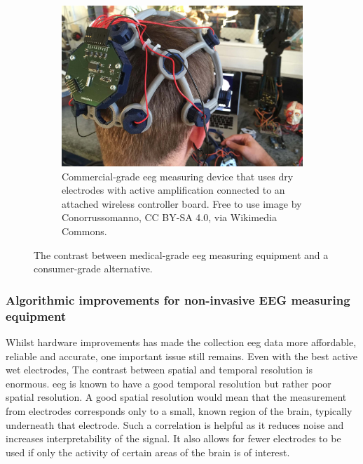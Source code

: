 \begin{figure}[ht]
\begin{minipage}{\textwidth}
\begin{subfigure}{.48\textwidth}
        \includegraphics[width=\textwidth]{../images/introduction/openbci.jpg}
        \captionsetup{width=0.9\linewidth}
        \captionsetup{justification=centering}
        \caption{Commercial-grade \gls{eeg} measuring device that uses dry electrodes with active amplification connected to an attached wireless controller board. Free to use image by Conorrussomanno, CC BY-SA 4.0, via Wikimedia Commons.}
        \label{fig:example_eeg_measuring_devices_commercial_clean}
    \end{subfigure}
    \captionsetup{width=0.9\linewidth}
    \captionsetup{justification=centering}
    \caption{The contrast between medical-grade \gls{eeg} measuring equipment and a consumer-grade alternative.}
    \label{fig:example_eeg_measuring_devices}
  \end{minipage}  
\end{figure}


\subsubsection{Algorithmic improvements for non-invasive EEG measuring equipment}
\label{subsubsec:bci_gaining_popularity_better_measuring_software}

Whilst hardware improvements has made the collection \gls{eeg} data more affordable, reliable and accurate, one important issue still remains.
Even with the best active wet electrodes, The contrast between spatial and temporal resolution is enormous.
\Gls{eeg} is known to have a good temporal resolution but rather poor spatial resolution.
A good spatial resolution would mean that the measurement from electrodes corresponds only to a small, known region of the brain, typically underneath that electrode.
Such a correlation is helpful as it reduces noise and increases interpretability of the signal.
It also allows for fewer electrodes to be used if only the activity of certain areas of the brain is of interest.

